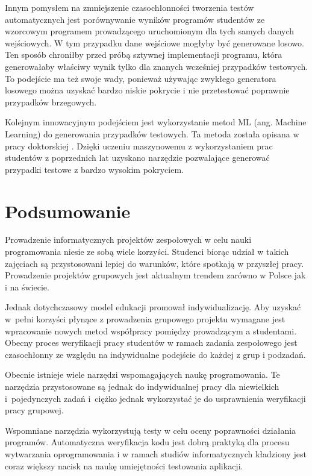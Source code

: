 Innym pomysłem na zmniejszenie czasochłonności tworzenia testów automatycznych jest porównywanie wyników programów studentów ze wzorcowym programem prowadzącego uruchomionym dla tych samych danych wejściowych.
W tym przypadku dane wejściowe mogłyby być generowane losowo.
Ten sposób chroniłby przed próbą sztywnej implementacji programu, która generowałaby właściwy wynik tylko dla znanych wcześniej przypadków testowych.
To podejście ma też swoje wady, ponieważ używając zwykłego generatora losowego można uzyskać bardzo niskie pokrycie i nie przetestować poprawnie przypadków brzegowych.

Kolejnym innowacyjnym podejściem jest wykorzystanie metod ML (ang. Machine Learning) do generowania przypadków testowych.
Ta metoda została opisana w pracy doktorskiej \cite{teach-testing-thesis}.
Dzięki uczeniu maszynowemu z wykorzystaniem prac studentów z poprzednich lat uzyskano narzędzie pozwalające generować przypadki testowe z bardzo wysokim pokryciem.



\section{Podsumowanie}

Prowadzenie informatycznych projektów zespołowych w celu nauki programowania niesie ze sobą wiele korzyści.
Studenci biorąc udział w takich zajęciach są przystosowani lepiej do warunków, które spotkają w przyszłej pracy.
Prowadzenie projektów grupowych jest aktualnym trendem zarówno w Polsce jak i na świecie.

Jednak dotychczasowy model edukacji promował indywidualizację.
Aby uzyskać w~pełni korzyści płynące z prowadzenia grupowego projektu wymagane jest wpracowanie nowych metod współpracy pomiędzy prowadzącym a studentami.
Obecny proces weryfikacji pracy studentów w ramach zadania zespołowego jest czasochłonny ze względu na indywidualne podejście do każdej z grup i podzadań.

Obecnie istnieje wiele narzędzi wspomagających naukę programowania.
Te narzędzia przystosowane są jednak do indywidualnej pracy dla niewielkich i~pojedynczych zadań i~ciężko jednak wykorzystać je do usprawnienia weryfikacji pracy grupowej.

Wspomniane narzędzia wykorzystują testy w celu oceny poprawności działania programów.
Automatyczna weryfikacja kodu jest dobrą praktyką dla procesu wytwarzania oprogramowania i w ramach studiów informatycznych kładziony jest coraz większy nacisk na naukę umiejętności testowania aplikacji.


